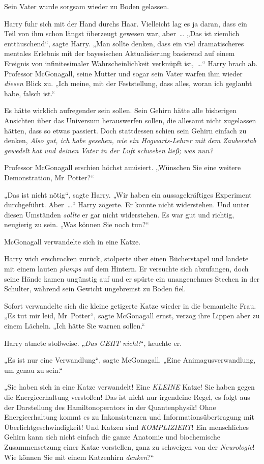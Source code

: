 {Sein Vater wurde sorgsam wieder zu Boden gelassen.

Harry fuhr sich mit der Hand durchs Haar. Vielleicht lag es ja daran, dass ein Teil von ihm schon längst überzeugt gewesen war, aber~… „Das ist ziemlich enttäuschend“, sagte Harry. „Man sollte denken, dass ein viel dramatischeres mentales Erlebnis mit der bayesischen Aktualisierung basierend auf einem Ereignis von infinitesimaler Wahrscheinlichkeit verknüpft ist,~…“ Harry brach ab. Professor McGonagall, seine Mutter und sogar sein Vater warfen ihm wieder \emph{diesen} Blick zu. „Ich meine, mit der Feststellung, dass alles, woran ich geglaubt habe, falsch ist.“

Es hätte wirklich aufregender sein sollen. Sein Gehirn hätte alle bisherigen Ansichten über das Universum herauswerfen sollen, die allesamt nicht zugelassen hätten, dass so etwas passiert. Doch stattdessen schien sein Gehirn einfach zu denken, \emph{Also gut, ich habe gesehen, wie ein Hogwarts-Lehrer mit dem Zauberstab gewedelt hat und deinen Vater in der Luft schweben ließ; was nun?}

Professor McGonagall erschien höchst amüsiert. „Wünschen Sie eine weitere Demonstration, Mr~Potter?“

„Das ist nicht nötig“, sagte Harry. „Wir haben ein aussagekräftiges Experiment durchgeführt. Aber~…“ Harry zögerte. Er konnte nicht widerstehen. Und unter diesen Umständen \emph{sollte} er gar nicht widerstehen. Es war gut und richtig, neugierig zu sein. „Was können Sie noch tun?“

McGonagall verwandelte sich in eine Katze.

Harry wich erschrocken zurück, stolperte über einen Bücherstapel und landete mit einem lauten \emph{plumps} auf dem Hintern. Er versuchte sich abzufangen, doch seine Hände kamen ungünstig auf und er spürte ein unangenehmes Stechen in der Schulter, während sein Gewicht ungebremst zu Boden fiel.

Sofort verwandelte sich die kleine getigerte Katze wieder in die bemantelte Frau. „Es tut mir leid, Mr~Potter“, sagte McGonagall ernst, verzog ihre Lippen aber zu einem Lächeln. „Ich hätte Sie warnen sollen.“

Harry atmete stoßweise. „\emph{Das GEHT nicht!}“, keuchte er.

„Es ist nur eine Verwandlung“, sagte McGonagall. „Eine Animagusverwandlung, um genau zu sein.“

„Sie haben sich in eine Katze verwandelt! Eine \emph{KLEINE} Katze! Sie haben gegen die Energieerhaltung verstoßen! Das ist nicht nur irgendeine Regel, es folgt aus der Darstellung des Hamiltonoperators in der Quantenphysik! Ohne Energieerhaltung kommt es zu Inkonsistenzen und Informationsübertragung mit Überlichtgeschwindigkeit! Und Katzen sind \emph{KOMPLIZIERT}! Ein menschliches Gehirn kann sich nicht einfach die ganze Anatomie und biochemische Zusammensetzung einer Katze vorstellen, ganz zu schweigen von der \emph{Neurologie}! Wie können Sie mit einem Katzenhirn \emph{denken}?“

}
